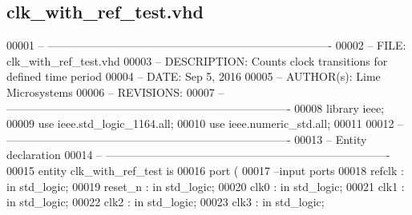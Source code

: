 \subsection{clk\+\_\+with\+\_\+ref\+\_\+test.\+vhd}
\label{clk__with__ref__test_8vhd_source}

\begin{DoxyCode}
00001 \textcolor{keyword}{-- ---------------------------------------------------------------------------- }
00002 \textcolor{keyword}{-- FILE:    clk\_with\_ref\_test.vhd}
00003 \textcolor{keyword}{-- DESCRIPTION: Counts clock transitions for defined time period}
00004 \textcolor{keyword}{-- DATE:    Sep 5, 2016}
00005 \textcolor{keyword}{-- AUTHOR(s):   Lime Microsystems}
00006 \textcolor{keyword}{-- REVISIONS:}
00007 \textcolor{keyword}{-- ---------------------------------------------------------------------------- }
00008 \textcolor{vhdlkeyword}{library }\textcolor{keywordflow}{ieee};
00009 \textcolor{vhdlkeyword}{use }ieee.std\_logic\_1164.\textcolor{keywordflow}{all};
00010 \textcolor{vhdlkeyword}{use }ieee.numeric\_std.\textcolor{keywordflow}{all};
00011 
00012 \textcolor{keyword}{-- ----------------------------------------------------------------------------}
00013 \textcolor{keyword}{-- Entity declaration}
00014 \textcolor{keyword}{-- ----------------------------------------------------------------------------}
00015 \textcolor{keywordflow}{entity }clk_with_ref_test \textcolor{keywordflow}{is}
00016   \textcolor{keywordflow}{port} \textcolor{vhdlchar}{(}
00017 \textcolor{keyword}{        --input ports }
00018         \textcolor{vhdlchar}{refclk}          \textcolor{vhdlchar}{:} \textcolor{keywordflow}{in} \textcolor{comment}{std\_logic};
00019         \textcolor{vhdlchar}{reset_n}         \textcolor{vhdlchar}{:} \textcolor{keywordflow}{in} \textcolor{comment}{std\_logic};
00020           \textcolor{vhdlchar}{clk0}              \textcolor{vhdlchar}{:} \textcolor{keywordflow}{in} \textcolor{comment}{std\_logic};
00021           \textcolor{vhdlchar}{clk1}              \textcolor{vhdlchar}{:} \textcolor{keywordflow}{in} \textcolor{comment}{std\_logic};
00022           \textcolor{vhdlchar}{clk2}              \textcolor{vhdlchar}{:} \textcolor{keywordflow}{in} \textcolor{comment}{std\_logic};
00023           \textcolor{vhdlchar}{clk3}              \textcolor{vhdlchar}{:} \textcolor{keywordflow}{in} \textcolor{comment}{std\_logic};

\end{DoxyCode}
